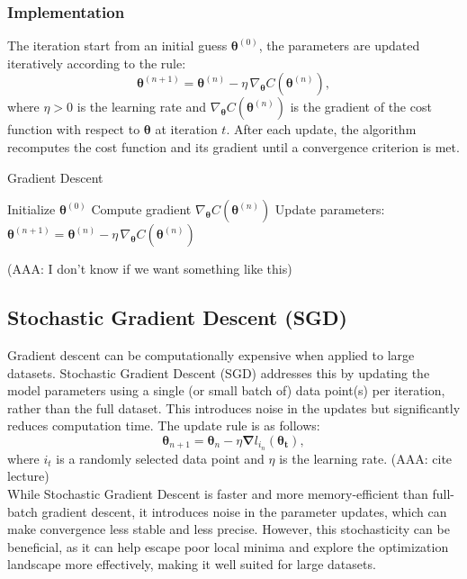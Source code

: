 \documentclass[
 reprint,            %
 amsmath,amssymb,
 aps,
]{revtex4-2}
\begin{document}
\subsubsection{Implementation}
The iteration start from an initial guess $\boldsymbol{\theta}^{(0)}$, the parameters are updated iteratively according to the rule:
\[
\boldsymbol{\theta}^{(n+1)} = \boldsymbol{\theta}^{(n)} - \eta \, \nabla_{\boldsymbol{\theta}} C(\boldsymbol{\theta}^{(n)}),
\]
where $\eta > 0$ is the learning rate and $\nabla_{\boldsymbol{\theta}} C(\boldsymbol{\theta}^{(n)})$ is the gradient of the cost function with respect to $\boldsymbol{\theta}$ at iteration $t$.
After each update, the algorithm recomputes the cost function and its gradient until a convergence criterion is met.\\

\begin{algorithm}[H]
\caption{Gradient Descent}
\begin{algorithmic}[1]
\State Initialize $\boldsymbol{\theta}^{(0)}$
    \State Compute gradient $\nabla_{\boldsymbol{\theta}} C(\boldsymbol{\theta}^{(n)})$
    \State Update parameters: 
    $\boldsymbol{\theta}^{(n+1)} = \boldsymbol{\theta}^{(n)} - \eta \, \nabla_{\boldsymbol{\theta}} C(\boldsymbol{\theta}^{(n)})$
\EndFor
\end{algorithmic}
\end{algorithm}

(AAA: I don't know if we want something like this)

\subsection{Stochastic Gradient Descent (SGD)}
Gradient descent can be computationally expensive when applied to large datasets. Stochastic Gradient Descent (SGD) addresses this by updating the model parameters using a single (or small batch of) data point(s) per iteration, rather than the full dataset. This introduces noise in the updates but significantly reduces computation time. The update rule is as follows:  
$$
\boldsymbol{\theta}_{n+1} = \boldsymbol{\theta}_n - {\eta \boldsymbol{\nabla}} l_{i_n} (\boldsymbol{\theta_t}),
$$  
where \(i_t\) is a randomly selected data point and \(\eta\) is the learning rate. (AAA: cite lecture)\\

While Stochastic Gradient Descent is faster and more memory-efficient than full-batch gradient descent, it introduces noise in the parameter updates, which can make convergence less stable and less precise. However, this stochasticity can be beneficial, as it can help escape poor local minima and explore the optimization landscape more effectively, making it well suited for large datasets.
\end{document}
